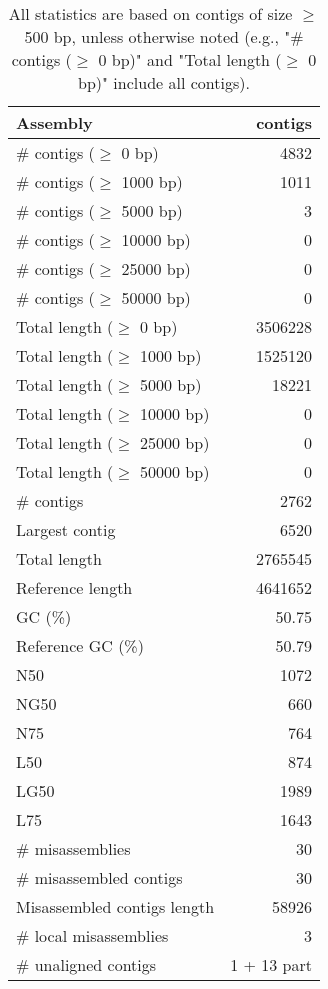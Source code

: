 \documentclass[12pt,a4paper]{article}
\begin{document}
\begin{table}[ht]
\begin{center}
\caption{All statistics are based on contigs of size $\geq$ 500 bp, unless otherwise noted (e.g., "\# contigs ($\geq$ 0 bp)" and "Total length ($\geq$ 0 bp)" include all contigs).}
\begin{tabular}{|l*{1}{|r}|}
\hline
Assembly & contigs \\ \hline
\# contigs ($\geq$ 0 bp) & 4832 \\ \hline
\# contigs ($\geq$ 1000 bp) & 1011 \\ \hline
\# contigs ($\geq$ 5000 bp) & 3 \\ \hline
\# contigs ($\geq$ 10000 bp) & 0 \\ \hline
\# contigs ($\geq$ 25000 bp) & 0 \\ \hline
\# contigs ($\geq$ 50000 bp) & 0 \\ \hline
Total length ($\geq$ 0 bp) & 3506228 \\ \hline
Total length ($\geq$ 1000 bp) & 1525120 \\ \hline
Total length ($\geq$ 5000 bp) & 18221 \\ \hline
Total length ($\geq$ 10000 bp) & 0 \\ \hline
Total length ($\geq$ 25000 bp) & 0 \\ \hline
Total length ($\geq$ 50000 bp) & 0 \\ \hline
\# contigs & 2762 \\ \hline
Largest contig & 6520 \\ \hline
Total length & 2765545 \\ \hline
Reference length & 4641652 \\ \hline
GC (\%) & 50.75 \\ \hline
Reference GC (\%) & 50.79 \\ \hline
N50 & 1072 \\ \hline
NG50 & 660 \\ \hline
N75 & 764 \\ \hline
L50 & 874 \\ \hline
LG50 & 1989 \\ \hline
L75 & 1643 \\ \hline
\# misassemblies & 30 \\ \hline
\# misassembled contigs & 30 \\ \hline
Misassembled contigs length & 58926 \\ \hline
\# local misassemblies & 3 \\ \hline
\# unaligned contigs & 1 + 13 part \\ \hline

\end{tabular}
\end{center}
\end{table}
\end{document}
